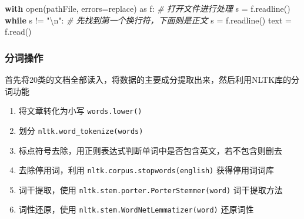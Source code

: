 \documentclass[
]{article}
\newenvironment{Shaded}{}{}
\newcommand{\BuiltInTok}[1]{#1}
\newcommand{\CharTok}[1]{\textcolor[rgb]{0.25,0.44,0.63}{#1}}
\newcommand{\CommentTok}[1]{\textcolor[rgb]{0.38,0.63,0.69}{\textit{#1}}}
\newcommand{\ControlFlowTok}[1]{\textcolor[rgb]{0.00,0.44,0.13}{\textbf{#1}}}
\newcommand{\ImportTok}[1]{#1}
\newcommand{\NormalTok}[1]{#1}
\newcommand{\OperatorTok}[1]{\textcolor[rgb]{0.40,0.40,0.40}{#1}}
\newcommand{\StringTok}[1]{\textcolor[rgb]{0.25,0.44,0.63}{#1}}
\begin{document}
\begin{Shaded}
\begin{Highlighting}[]
\ControlFlowTok{with} \BuiltInTok{open}\NormalTok{(pathFile, errors}\OperatorTok{=}\StringTok{\textquotesingle{}replace\textquotesingle{}}\NormalTok{) }\ImportTok{as}\NormalTok{ f:  }\CommentTok{\# 打开文件进行处理}
\NormalTok{    s }\OperatorTok{=}\NormalTok{ f.readline()}
    \ControlFlowTok{while}\NormalTok{ s }\OperatorTok{!=} \StringTok{"}\CharTok{\textbackslash{}n}\StringTok{"}\NormalTok{:  }\CommentTok{\# 先找到第一个换行符，下面则是正文}
\NormalTok{        s }\OperatorTok{=}\NormalTok{ f.readline()}
\NormalTok{        text }\OperatorTok{=}\NormalTok{ f.read()}
\end{Highlighting}
\end{Shaded}

\hypertarget{ux5206ux8bcdux64cdux4f5c}{%
\subsubsection{分词操作}\label{ux5206ux8bcdux64cdux4f5c}}

首先将20类的文档全部读入，将数据的主要成分提取出来，然后利用NLTK库的分词功能

\begin{enumerate}
\def\labelenumi{\arabic{enumi}.}
\item
  将文章转化为小写 \texttt{words.lower()}
\item
  划分 \texttt{nltk.word\_tokenize(words)}
\item
  标点符号去除，用正则表达式判断单词中是否包含英文，若不包含则删去
\item
  去除停用词，利用
  \texttt{nltk.corpus.stopwords(\textquotesingle{}english\textquotesingle{})}
  获得停用词词库
\item
  词干提取，使用 \texttt{nltk.stem.porter.PorterStemmer(word)}
  词干提取方法
\item
  词性还原，使用 \texttt{nltk.stem.WordNetLemmatizer(word)} 还原词性
\end{enumerate}
\end{document}
